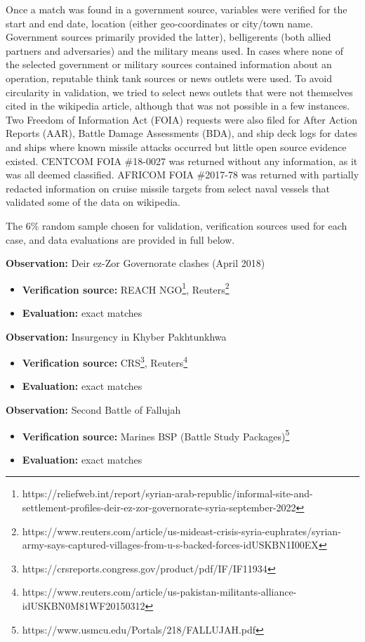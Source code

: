 \documentclass[fleqn,12pt]{article}
\begin{document}
Once a match was found in a government source, variables were verified for the start and end date, location (either geo-coordinates or city/town name. Government sources primarily provided the latter), belligerents (both allied partners and adversaries) and the military means used. In cases where none of the selected government or military sources contained information about an operation, reputable think tank sources or news outlets were used. To avoid circularity in validation, we tried to select news outlets that were not themselves cited in the wikipedia article, although that was not possible in a few instances. Two Freedom of Information Act (FOIA) requests were also filed for After Action Reports (AAR), Battle Damage Assessments (BDA), and ship deck logs for dates and ships where known missile attacks occurred but little open source evidence existed. CENTCOM FOIA \#18-0027 was returned without any information, as it was all deemed classified. AFRICOM FOIA \#2017-78 was returned with partially redacted information on cruise missile targets from select naval vessels that validated some of the data on wikipedia.

The 6\% random sample chosen for validation, verification sources used for each case, and data evaluations are provided in full below.

\textbf{Observation:} Deir ez-Zor Governorate clashes (April 2018)
\begin{itemize}
    \item \textbf{Verification source:} REACH NGO\footnote{https://reliefweb.int/report/syrian-arab-republic/informal-site-and-settlement-profiles-deir-ez-zor-governorate-syria-september-2022}, Reuters\footnote{https://www.reuters.com/article/us-mideast-crisis-syria-euphrates/syrian-army-says-captured-villages-from-u-s-backed-forces-idUSKBN1I00EX}
    \item \textbf{Evaluation:} exact matches
\end{itemize}

\textbf{Observation:} Insurgency in Khyber Pakhtunkhwa
\begin{itemize}
    \item \textbf{Verification source:} CRS\footnote{https://crsreports.congress.gov/product/pdf/IF/IF11934}, Reuters\footnote{https://www.reuters.com/article/us-pakistan-militants-alliance-idUSKBN0M81WF20150312}
    \item \textbf{Evaluation:} exact matches
\end{itemize}

\textbf{Observation:} Second Battle of Fallujah
\begin{itemize}
    \item \textbf{Verification source:} Marines BSP (Battle Study Packages)\footnote{https://www.usmcu.edu/Portals/218/FALLUJAH.pdf}
    \item \textbf{Evaluation:} exact matches
\end{itemize}
\end{document}
